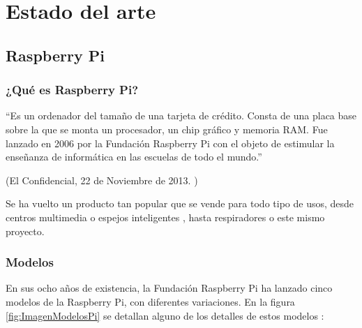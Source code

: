 
\chapter{Estado del arte} %
\label{sec:EstadoDelArte}

    \section{Raspberry Pi} %
    \label{sec:RaspberryPi}

        \subsection{¿Qué es Raspberry Pi?} %
        \label{sub:QueEsRaspberryPi}

            ``Es un ordenador del tamaño de una tarjeta de crédito. Consta de una placa base sobre la que se monta un
            procesador, un chip gráfico y memoria RAM. Fue lanzado en 2006 por la Fundación Raspberry Pi con el objeto
            de estimular la enseñanza de informática en las escuelas de todo el mundo.''

            \begin{flushright}
                (El Confidencial, 22 de Noviembre de 2013. \cite{confidencial_raspberry})
            \end{flushright}

            Se ha vuelto un producto tan popular que se vende para todo tipo de usos, desde centros
            multimedia \cite{centro_multimedia_raspberry_pi} o espejos inteligentes \cite{espejo_raspberry_pi}, hasta 
            respiradores \cite{github_respirador} o este mismo proyecto.


        \subsection{Modelos} %
        \label{sub:ModelosRaspberryPi}

            En sus ocho años de existencia, la Fundación Raspberry Pi ha lanzado cinco modelos de la Raspberry Pi, con
            diferentes variaciones. En la figura \ref{fig:ImagenModelosPi} se detallan alguno de los detalles de estos
            modelos \cite{raspberry_pi_wikipedia_en}:

